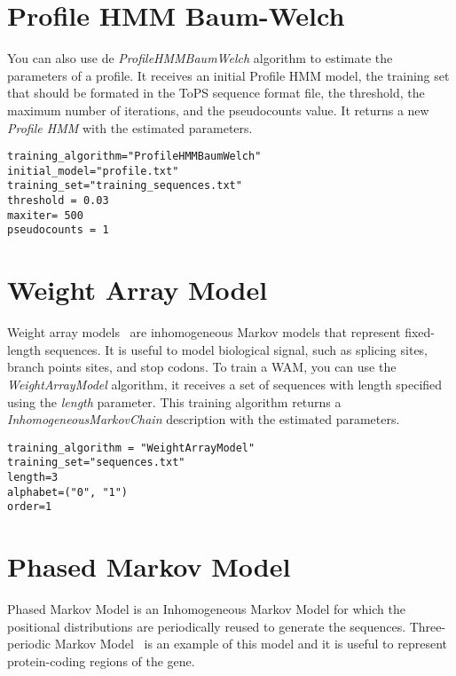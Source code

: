 \section{Profile HMM Baum-Welch}

You can also use de \textit{ProfileHMMBaumWelch} algorithm to estimate the parameters of a profile. It receives an initial Profile HMM model, the training set that should be formated in the ToPS sequence format file, the threshold, the maximum number of iterations, and the pseudocounts value.
It returns a new \textit{Profile HMM} with the estimated parameters.

\begin{Verbatim}[frame=single,label=train.txt]
training_algorithm="ProfileHMMBaumWelch"
initial_model="profile.txt"
training_set="training_sequences.txt"
threshold = 0.03
maxiter= 500
pseudocounts = 1
\end{Verbatim}


\section{Weight Array Model}

Weight array models~\cite{Burge1997,Zhang1993} are inhomogeneous Markov models that represent fixed-length sequences. It is useful to model biological signal, such as splicing sites,  branch points sites, and stop codons. To train a WAM, you can use the \textit{WeightArrayModel} algorithm, it receives a set of sequences with length specified using the \textit{length} parameter. This training algorithm returns a \textit{InhomogeneousMarkovChain} description with the estimated parameters.

\begin{Verbatim}[frame=single,label=train.txt]
training_algorithm = "WeightArrayModel"
training_set="sequences.txt"
length=3
alphabet=("0", "1")
order=1
\end{Verbatim}

\section{Phased Markov Model}

Phased Markov Model is an Inhomogeneous Markov Model for which the positional distributions are periodically reused to generate the sequences. 
Three-periodic Markov Model~\cite{Borodovsky1993}  is an example of this model and it is useful to represent protein-coding regions of the gene. 

